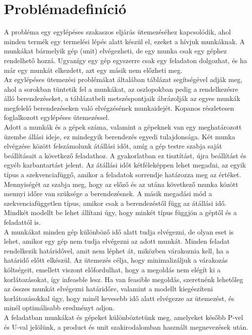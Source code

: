 \documentclass [12pt]{report}
\begin{document}
\chapter{Problémadefiníció}
A probléma egy egylépéses szakaszos eljárás ütemezéséhez kapcsolódik, ahol minden termék egy termelési lépés alatt készül el, ezeket a hívjuk munkáknak. A munkákat bármelyik gép (unit) elvégezheti, de egy munka csak egy géphez rendelhető hozzá. Ugyanígy egy gép egyszerre csak egy feladaton dolgozhat, és ha már egy munkát elkezdett, azt egy másik nem előzheti meg. \\
Az egylépéses ütemezési problémákat általában táblázat segítségével adják meg, ahol a sorokban tüntetik fel a munkákat, az oszlopokban pedig a rendelkezésre álló berendezéseket, a táblázatbeli metszéspontjaik ábrázolják az egyes munkák megfelelő berendezéseken való elvégzésének munkaidejét. Kopanos részletesen foglalkozott egylépéses ütemezéssel. \cite{Kopanos2009}\\
Adott a munkák és a gépek száma, valamint a gépeknek van egy meghatározott üzembe állási ideje, ez mindegyik berendezés egyedi tulajdonsága. Két munka elvégzése között felszámolunk átállási időt, amíg a gép testre szabja saját beállításait a következő feladathoz. A gyakorlatban ez tisztítást, újra beállítást és egyéb karbantartást jelent. Az átállási időt kétféleképpen lehet megadni, az egyik típus a szekvenciafüggő, amikor a feladatok sorrendje határozza meg az értéket. Mennyiségét az szabja meg, hogy az előző és az utána következő munka között mennyi időre van szüksége a berendezésnek. A másik megadási mód a szekvenciafüggetlen típus, amikor csak a berendezéstől függ az átállási idő. Mindkét modellt be lehet állítani úgy, hogy minkét típus függjön a géptől és a feladattól is. \\
A munkákat minden gép különböző idő alatt tudja elvégezni, de olyan eset is lehet, amikor egy gép nem tudja elvégezni az adott munkát. Minden feladat rendelkezik határidővel, amit nem léphet át, miközben várakoznia kell, ha a határidő előtt elkészül. Az ütemezés célja, hogy minimalizáljuk a várakozás költségeit, emellett viszont előfordulhat, hogy a megoldás nem elégít ki a korlátozásokat, így infeasble lesz. Ha van feasible megoldás, szeretnénk lehetőleg az összes munkát elvégezni határidőre, valamint a modellt kiegészíteni korlátozásokkal úgy, hogy minél kevesebb idő alatt elvégezze az ütemezést, és minél optimálisabb eredményt adjon.  \\
A feladatban munkákat és gépeket különböztetünk meg, amelyeket később P-vel és U-val jelölünk, a product és unit szakirodalomban használt megnevezések után. \cite{Behrmann2001}
 
\end{document}
